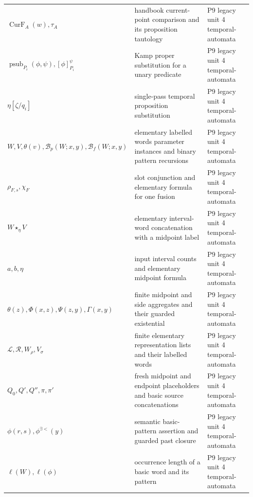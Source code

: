 \begin{longtable}{@{}p{}p{}p{}@{}}
\(\operatorname{CurF}_A(w),\allowbreak \tau_A\) & handbook current-point comparison and its proposition tautology & P9 legacy unit 4 temporal-\allowbreak{}automata \\
\(\operatorname{psub}_{P_i}(\phi,\allowbreak \psi),\allowbreak [\phi]^\psi_{P_i}\) & Kamp proper substitution for a unary predicate & P9 legacy unit 4 temporal-\allowbreak{}automata \\
\(\eta[\zeta/q_i]\) & single-pass temporal proposition substitution & P9 legacy unit 4 temporal-\allowbreak{}automata \\
\(W,\allowbreak V,\allowbreak \theta(v),\allowbreak \mathcal B_p(W;\allowbreak x,\allowbreak y),\allowbreak \mathcal B_f(W;\allowbreak x,\allowbreak y)\) & elementary labelled words parameter instances and binary pattern recursions & P9 legacy unit 4 temporal-\allowbreak{}automata \\
\(\rho_{F,s},\allowbreak \chi_F\) & slot conjunction and elementary formula for one fusion & P9 legacy unit 4 temporal-\allowbreak{}automata \\
\(W\mathbin{\star_\eta}V\) & elementary interval-word concatenation with a midpoint label & P9 legacy unit 4 temporal-\allowbreak{}automata \\
\(a,\allowbreak b,\allowbreak \eta\) & input interval counts and elementary midpoint formula & P9 legacy unit 4 temporal-\allowbreak{}automata \\
\(\theta(z),\allowbreak \Phi(x,\allowbreak z),\allowbreak \Psi(z,\allowbreak y),\allowbreak \Gamma(x,\allowbreak y)\) & finite midpoint and side aggregates and their guarded existential & P9 legacy unit 4 temporal-\allowbreak{}automata \\
\(\mathcal L,\allowbreak \mathcal R,\allowbreak W_\rho,\allowbreak V_\sigma\) & finite elementary representation lists and their labelled words & P9 legacy unit 4 temporal-\allowbreak{}automata \\
\(Q_0,\allowbreak Q',\allowbreak Q'',\allowbreak \pi,\allowbreak \pi'\) & fresh midpoint and endpoint placeholders and basic source concatenations & P9 legacy unit 4 temporal-\allowbreak{}automata \\
\(\phi(r,\allowbreak s),\allowbreak \phi^{\exists<}(y)\) & semantic basic-pattern assertion and guarded past closure & P9 legacy unit 4 temporal-\allowbreak{}automata \\
\(\ell(W),\allowbreak \ell(\phi)\) & occurrence length of a basic word and its pattern & P9 legacy unit 4 temporal-\allowbreak{}automata \\

\end{longtable}
